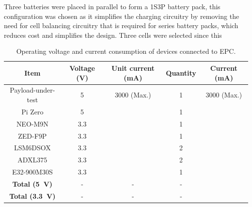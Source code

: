 \documentclass[a4paper,11pt]{article}
\begin{document}
Three batteries were placed in parallel to form a 1S3P battery pack, this configuration was chosen as it simplifies the charging circuitry by removing the need for cell balancing circuitry that is required for series battery packs, which reduces cost and simplifies the design. Three cells were selected since this %

\begin{table}[H]
  \centering
  \begin{tabular}{|c|c|c|c|c|}
    \hline
    \textbf{Item}                    & \textbf{Voltage (\si{\volt})} & \textbf{Unit current (\si{\milli\ampere})} & \textbf{Quantity} & \textbf{Current (\si{\milli\ampere})} \\
    \hline
    Payload-under-test               & 5                             & 3000 (Max.)                                & 1                 & 3000 (Max.)                           \\
    Pi Zero                          & 5                             &                                            & 1                 &                                       \\
    NEO-M9N                          & 3.3                           &                                            & 1                 &                                       \\
    ZED-F9P                          & 3.3                           &                                            & 1                 &                                       \\
    LSM6DSOX                         & 3.3                           &                                            & 2                 &                                       \\
    ADXL375                          & 3.3                           &                                            & 2                 &                                       \\
    E32-900M30S                      & 3.3                           &                                            & 1                 &                                       \\
    \hline
    \textbf{Total (\SI{5}{\volt})}   & -                             & -                                          & -                 &                                       \\
    \textbf{Total (\SI{3.3}{\volt})} & -                             & -                                          & -                 &                                       \\
    \hline
  \end{tabular}
  \caption{Operating voltage and current consumption of devices connected to EPC.}
  \label{tabl:epc-power-budget}
\end{table}
\end{document}
